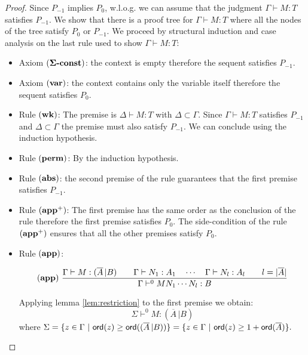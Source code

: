 \begin{proof}
Since $P_{-1}$ implies $P_0$, w.l.o.g. we can assume that the
judgment $\Gamma \vdash M : T$ satisfies $P_{-1}$. We show that
there is a proof tree for $\Gamma \vdash M : T$ where all the nodes
of the tree satisfy $P_0$ or $P_{-1}$. We proceed by structural
induction and case analysis on the last rule used to show $\Gamma
\vdash M : T$:
\begin{itemize}
\item Axiom $\mathbf{(\Sigma\mbox{\textbf{-const}})}$: the context is empty therefore the sequent satisfies $P_{-1}$.

\item Axiom $\mathbf{(var)}$: the context contains only the variable itself therefore the sequent satisfies $P_0$.

\item Rule $\mathbf{(wk)}$: The premise is $\Delta \vdash M : T$ with $\Delta \subset \Gamma$. Since
$\Gamma \vdash M : T$ satisfies $P_{-1}$ and $\Delta \subset \Gamma$ the premise must also satisfy $P_{-1}$. We can conclude using the
induction hypothesis.

\item Rule $\mathbf{(perm)}$: By the induction hypothesis.


\item Rule $\mathbf{(abs)}$: the second premise of the rule guarantees that the first
premise satisfies $P_{-1}$.

\item Rule $\mathbf{(app^+)}$: The first premise has the same order as the
conclusion of the rule therefore the first premise satisfies
$P_0$. The side-condition of the rule $\mathbf{(app^+)}$ ensures that all the other premises satisfy $P_0$.

\item Rule $\mathbf{(app)}$:

$$ \mathbf{(app)} \
    \frac{\displaystyle 
        { \Gamma \vdash M : (\overline{A} \, | B)
        \qquad
        \Gamma \vdash N_1 : A_1 \quad \cdots \quad \Gamma \vdash N_{l} : A_l \qquad l = |\overline{A}|
        }
    }{
        \Gamma \vdash^0 M N_1 \cdots N_{l} : B
    }
$$

Applying lemma \ref{lem:restriction} to the first premise we obtain:
\begin{equation}
 \Sigma \vdash^0 M : (\overline{A} \, | B) \label{eq:seq1}
\end{equation}
where $\Sigma = \{ z \in \Gamma \ | \ {\sf ord}(z) \geq {\sf ord}((\overline{A} \, | B)) \} = \{ z \in \Gamma \ | \ {\sf ord}(z) \geq 1 + {\sf ord}(\overline{A}) \}.$


\end{itemize}
\end{proof}
